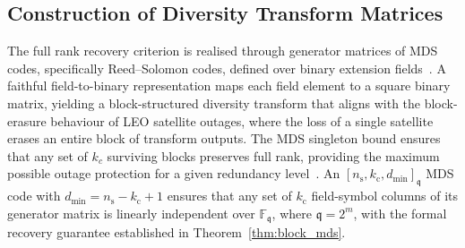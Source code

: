 \documentclass[journal]{IEEEtran}
\begin{document}
\subsection{Construction of Diversity Transform Matrices}
\label{sec:diversity_transform_construction}
The full rank recovery criterion is realised through generator 
matrices of MDS codes, specifically 
Reed--Solomon codes, defined over binary extension 
fields~\cite{Seroussi1986}. A faithful field-to-binary representation 
maps each field element to a square binary matrix, yielding a 
block-structured diversity transform that aligns with the 
block-erasure behaviour of LEO satellite outages, where the loss of 
a single satellite erases an entire block of transform outputs. The 
MDS singleton bound ensures that any set of $k_c$ surviving blocks preserves full rank, providing the maximum possible outage protection for a given redundancy level~\cite{Roth2006,HuffmanPless2003}. An 
$[n_{\mathrm{s}},k_{\mathrm{c}},d_{\min}]_{\mathfrak{q}}$ MDS code 
with $d_{\min} = n_{\mathrm{s}}-k_{\mathrm{c}}+1$ ensures that any 
set of $k_{\mathrm{c}}$ field-symbol columns of its generator matrix 
is linearly independent over $\mathbb{F}_{\mathfrak{q}}$, where 
$\mathfrak{q} = 2^{m}$, with the formal recovery guarantee 
established in Theorem~\ref{thm:block_mds}.
\end{document}
